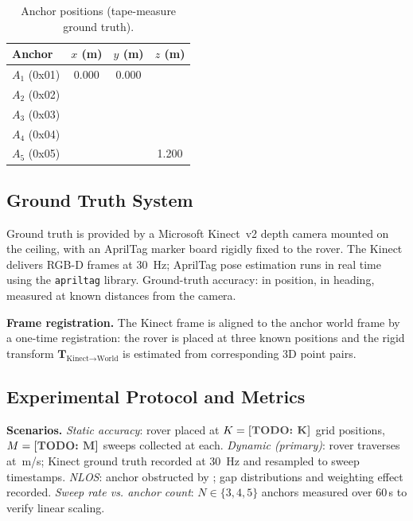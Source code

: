 \begin{table}[h]
  \centering
  \caption{Anchor positions (tape-measure ground truth).}
  \label{tab:anchor_positions}
  \begin{tabular}{lccc}
    \toprule
    Anchor & $x$ (m) & $y$ (m) & $z$ (m) \\
    \midrule
    $A_1$ (0x01) & 0.000 & 0.000 & \todo{} \\
    $A_2$ (0x02) & \todo{} & \todo{} & \todo{} \\
    $A_3$ (0x03) & \todo{} & \todo{} & \todo{} \\
    $A_4$ (0x04) & \todo{} & \todo{} & \todo{} \\
    $A_5$ (0x05) & \todo{} & \todo{} & 1.200 \\
    \bottomrule
  \end{tabular}
\end{table}

\subsection{Ground Truth System}

Ground truth is provided by a Microsoft Kinect~v2 depth camera
\cite{kinect_v2} mounted on the ceiling,
with an AprilTag marker board rigidly fixed to the rover.
The Kinect delivers RGB-D frames at \SI{30}{\hertz};
AprilTag pose estimation runs in real time using the \texttt{apriltag} library.
Ground-truth accuracy:  in position,  in heading,
measured at known distances from the camera.

\textbf{Frame registration.}
The Kinect frame is aligned to the anchor world frame by a one-time
registration: the rover is placed at three known positions and the rigid
transform $\mathbf{T}_{\text{Kinect}\to\text{World}}$ is estimated from
corresponding 3D point pairs.

\subsection{Experimental Protocol and Metrics}

\textbf{Scenarios.}
\textit{Static accuracy}: rover placed at $K = \todo{K}$ grid positions,
$M = \todo{M}$ sweeps collected at each.
\textit{Dynamic (primary)}: rover traverses  at \,m/s;
Kinect ground truth recorded at \SI{30}{\hertz} and resampled to sweep timestamps.
\textit{NLOS}: anchor  obstructed by ;
gap distributions and weighting effect recorded.
\textit{Sweep rate vs. anchor count}: $N \in \{3,4,5\}$ anchors measured
over 60\,s to verify linear scaling.

